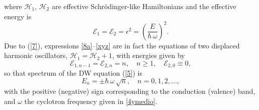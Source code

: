\documentclass[aps,showpacs,showkeys]{revtex4}
\begin{document}
where $\mathcal{H}_1$, $\mathcal{H}_2$ are effective Schr\"{o}dinger-like Hamiltonians and the effective energy is
\begin{equation}
	\label{xyz}
	\mathcal{E}_1=\mathcal{E}_2=\epsilon^2=\left(\frac{E}{\hbar\,\omega}\right)^2.
\end{equation}
Due to (\ref{7}), expressions \eqref{8a}--\eqref{xyz} are in fact the equations of two displaced harmonic oscillators, $\mathcal{H}_1=\mathcal{H}_2+1$, with energies given by
\begin{equation}\label{13}
	\mathcal{E}_{1,n-1}=\mathcal{E}_{2,n}=n, \quad n\geq 1, \quad \mathcal{E}_{2,0}\equiv0,
\end{equation} 
so that spectrum of the DW equation (\ref{5}) is
\begin{equation}\label{14}
	E_n=\pm\hbar\,\omega\, \sqrt{n}, \quad n=0,1,2,\dots,
\end{equation}
with the positive (negative) sign corresponding to the conduction (valence) band, and $\omega$ the cyclotron frequency given in \eqref{4ymedio}.
\end{document}
